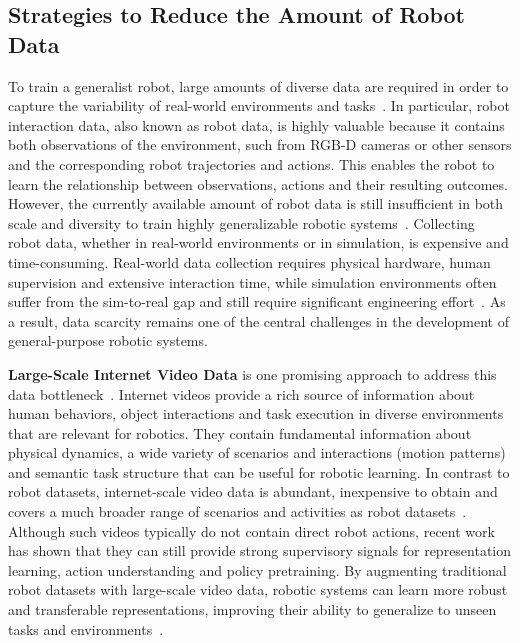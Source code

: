\subsection{Strategies to Reduce the Amount of Robot Data}
To train a generalist robot, large amounts of diverse data are required in order to capture the variability of real-world environments and tasks~\cite{McCarthy_2025, Eze2024LearningBW, Kawaharazuka2025VisionLanguageActionMF, Din2025VisionLA}. In particular, robot interaction data, also known as robot data, is highly valuable because it contains both observations of the environment, such from RGB-D cameras or other sensors and the corresponding robot trajectories and actions. This enables the robot to learn the relationship between observations, actions and their resulting outcomes.
However, the currently available amount of robot data is still insufficient in both scale and diversity to train highly generalizable robotic systems~\cite{McCarthy_2025}. Collecting robot data, whether in real-world environments or in simulation, is expensive and time-consuming. Real-world data collection requires physical hardware, human supervision and extensive interaction time, while simulation environments often suffer from the sim-to-real gap and still require significant engineering effort~\cite{McCarthy_2025}. As a result, data scarcity remains one of the central challenges in the development of general-purpose robotic systems.


\textbf{Large-Scale Internet Video Data} is one promising approach to address this data bottleneck~\cite{McCarthy_2025}. Internet videos provide a rich source of information about human behaviors, object interactions and task execution in diverse environments that are relevant for robotics. They contain fundamental information about physical dynamics, a wide variety of scenarios and interactions (motion patterns) and semantic task structure that can be useful for robotic learning. In contrast to robot datasets, internet-scale video data is abundant, inexpensive to obtain and covers a much broader range of scenarios and activities as robot datasets~\cite{McCarthy_2025}. 
Although such videos typically do not contain direct robot actions, recent work has shown that they can still provide strong supervisory signals for representation learning, action understanding and policy pretraining. By augmenting traditional robot datasets with large-scale video data, robotic systems can learn more robust and transferable representations, improving their ability to generalize to unseen tasks and environments~\cite{lin2024data}.

